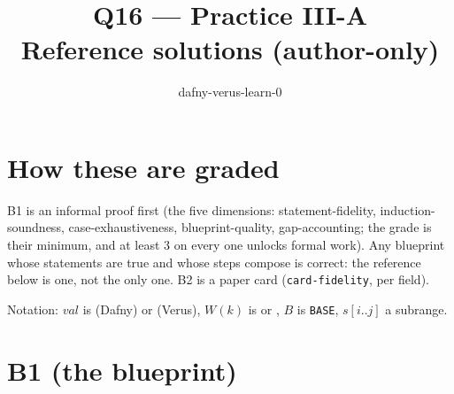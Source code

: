 \documentclass[11pt]{article}
\title{Q16 --- Practice III-A \\ \large Reference solutions (author-only)}
\author{dafny-verus-learn-0}
\date{}
\begin{document}
\maketitle
\sloppy

\section*{How these are graded}
B1 is an informal proof first (the five dimensions: statement-fidelity,
induction-soundness, case-exhaustiveness, blueprint-quality, gap-accounting;
the grade is their minimum, and at least 3 on every one unlocks formal work).
Any blueprint whose statements are true and whose steps compose is correct:
the reference below is one, not the only one. B2 is a paper card
(\texttt{card-fidelity}, per field).

Notation: $\mathit{val}$ is  (Dafny) or 
(Verus), $W(k)$ is  or , $B$ is \texttt{BASE},
$s[i..j]$ a subrange.

\section*{B1 (the blueprint)}
\end{document}
